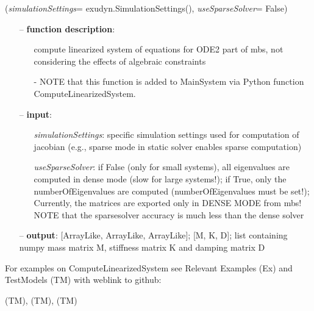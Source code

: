 %
\begin{flushleft}
\label{sec:mainsystemextensions:ComputeLinearizedSystem}
({\it simulationSettings}= exudyn.SimulationSettings(), {\it useSparseSolver}= False)
\end{flushleft}
\setlength{\itemindent}{0.7cm}
\begin{itemize}[leftmargin=0.7cm]
\item[--]
{\bf function description}: \vspace{-6pt}
\begin{itemize}[leftmargin=1.2cm]
\setlength{\itemindent}{-0.7cm}
\item[]compute linearized system of equations for ODE2 part of mbs, not considering the effects of algebraic constraints
\item[]- NOTE that this function is added to MainSystem via Python function ComputeLinearizedSystem.
\end{itemize}
\item[--]
{\bf input}: \vspace{-6pt}
\begin{itemize}[leftmargin=1.2cm]
\setlength{\itemindent}{-0.7cm}
\item[]{\it simulationSettings}: specific simulation settings used for computation of jacobian (e.g., sparse mode in static solver enables sparse computation)
\item[]{\it useSparseSolver}: if False (only for small systems), all eigenvalues are computed in dense mode (slow for large systems!); if True, only the numberOfEigenvalues are computed (numberOfEigenvalues must be set!); Currently, the matrices are exported only in DENSE MODE from mbs! NOTE that the sparsesolver accuracy is much less than the dense solver
\end{itemize}
\item[--]
{\bf output}: [ArrayLike, ArrayLike, ArrayLike]; [M, K, D]; list containing numpy mass matrix M, stiffness matrix K and damping matrix D
\vspace{12pt}\end{itemize}
%

%
\noindent For examples on ComputeLinearizedSystem see Relevant Examples (Ex) and TestModels (TM) with weblink to github:
\bi
 \item \footnotesize {} (TM), 
 (TM), 
 (TM)
\ei

